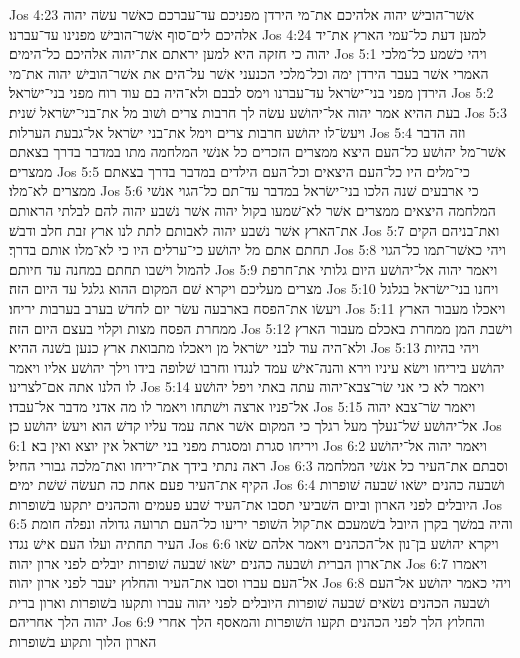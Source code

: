 Jos 4:23  אשׁר־הובישׁ יהוה אלהיכם את־מי הירדן מפניכם עד־עברכם כאשׁר עשׂה יהוה אלהיכם לים־סוף אשׁר־הובישׁ מפנינו עד־עברנו׃
Jos 4:24  למען דעת כל־עמי הארץ את־יד יהוה כי חזקה היא למען יראתם את־יהוה אלהיכם כל־הימים׃
Jos 5:1  ויהי כשׁמע כל־מלכי האמרי אשׁר בעבר הירדן ימה וכל־מלכי הכנעני אשׁר על־הים את אשׁר־הובישׁ יהוה את־מי הירדן מפני בני־ישׂראל עד־עברנו וימס לבבם ולא־היה בם עוד רוח מפני בני־ישׂראל׃
Jos 5:2  בעת ההיא אמר יהוה אל־יהושׁע עשׂה לך חרבות צרים ושׁוב מל את־בני־ישׂראל שׁנית׃
Jos 5:3  ויעשׂ־לו יהושׁע חרבות צרים וימל את־בני ישׂראל אל־גבעת הערלות׃
Jos 5:4  וזה הדבר אשׁר־מל יהושׁע כל־העם היצא ממצרים הזכרים כל אנשׁי המלחמה מתו במדבר בדרך בצאתם ממצרים׃
Jos 5:5  כי־מלים היו כל־העם היצאים וכל־העם הילדים במדבר בדרך בצאתם ממצרים לא־מלו׃
Jos 5:6  כי ארבעים שׁנה הלכו בני־ישׂראל במדבר עד־תם כל־הגוי אנשׁי המלחמה היצאים ממצרים אשׁר לא־שׁמעו בקול יהוה אשׁר נשׁבע יהוה להם לבלתי הראותם את־הארץ אשׁר נשׁבע יהוה לאבותם לתת לנו ארץ זבת חלב ודבשׁ׃
Jos 5:7  ואת־בניהם הקים תחתם אתם מל יהושׁע כי־ערלים היו כי לא־מלו אותם בדרך׃
Jos 5:8  ויהי כאשׁר־תמו כל־הגוי להמול וישׁבו תחתם במחנה עד חיותם׃
Jos 5:9  ויאמר יהוה אל־יהושׁע היום גלותי את־חרפת מצרים מעליכם ויקרא שׁם המקום ההוא גלגל עד היום הזה׃
Jos 5:10  ויחנו בני־ישׂראל בגלגל ויעשׂו את־הפסח בארבעה עשׂר יום לחדשׁ בערב בערבות יריחו׃
Jos 5:11  ויאכלו מעבור הארץ ממחרת הפסח מצות וקלוי בעצם היום הזה׃
Jos 5:12  וישׁבת המן ממחרת באכלם מעבור הארץ ולא־היה עוד לבני ישׂראל מן ויאכלו מתבואת ארץ כנען בשׁנה ההיא׃
Jos 5:13  ויהי בהיות יהושׁע ביריחו וישׂא עיניו וירא והנה־אישׁ עמד לנגדו וחרבו שׁלופה בידו וילך יהושׁע אליו ויאמר לו הלנו אתה אם־לצרינו׃
Jos 5:14  ויאמר לא כי אני שׂר־צבא־יהוה עתה באתי ויפל יהושׁע אל־פניו ארצה וישׁתחו ויאמר לו מה אדני מדבר אל־עבדו׃
Jos 5:15  ויאמר שׂר־צבא יהוה אל־יהושׁע שׁל־נעלך מעל רגלך כי המקום אשׁר אתה עמד עליו קדשׁ הוא ויעשׂ יהושׁע כן׃
Jos 6:1  ויריחו סגרת ומסגרת מפני בני ישׂראל אין יוצא ואין בא׃
Jos 6:2  ויאמר יהוה אל־יהושׁע ראה נתתי בידך את־יריחו ואת־מלכה גבורי החיל׃
Jos 6:3  וסבתם את־העיר כל אנשׁי המלחמה הקיף את־העיר פעם אחת כה תעשׂה שׁשׁת ימים׃
Jos 6:4  ושׁבעה כהנים ישׂאו שׁבעה שׁופרות היובלים לפני הארון וביום השׁביעי תסבו את־העיר שׁבע פעמים והכהנים יתקעו בשׁופרות׃
Jos 6:5  והיה במשׁך בקרן היובל בשׁמעכם את־קול השׁופר יריעו כל־העם תרועה גדולה ונפלה חומת העיר תחתיה ועלו העם אישׁ נגדו׃
Jos 6:6  ויקרא יהושׁע בן־נון אל־הכהנים ויאמר אלהם שׂאו את־ארון הברית ושׁבעה כהנים ישׂאו שׁבעה שׁופרות יובלים לפני ארון יהוה׃
Jos 6:7  ויאמרו אל־העם עברו וסבו את־העיר והחלוץ יעבר לפני ארון יהוה׃
Jos 6:8  ויהי כאמר יהושׁע אל־העם ושׁבעה הכהנים נשׂאים שׁבעה שׁופרות היובלים לפני יהוה עברו ותקעו בשׁופרות וארון ברית יהוה הלך אחריהם׃
Jos 6:9  והחלוץ הלך לפני הכהנים תקעו השׁופרות והמאסף הלך אחרי הארון הלוך ותקוע בשׁופרות׃
